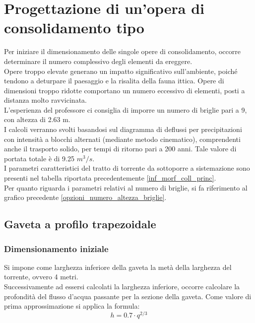 \section{Progettazione di un'opera di consolidamento tipo}
Per iniziare il dimensionamento delle singole opere di consolidamento, occorre determinare il numero complessivo degli elementi da ereggere.\\
Opere troppo elevate generano un impatto significativo sull'ambiente, poiché tendono a deturpare il paesaggio e la risalita della fauna ittica. Opere di dimensioni troppo ridotte comportano un numero eccessivo di elementi, posti a distanza molto ravvicinata.\\
L'esperienza del professore ci consiglia di imporre un numero di briglie pari a 9, con altezza di 2.63 m.\\
I calcoli verranno svolti basandosi sul diagramma di deflussi per precipitazioni con intensità a blocchi alternati (mediante metodo cinematico), comprendenti anche il trasporto solido, per tempi di ritorno pari a 200 anni. Tale valore di portata totale è di 9.25 $m^3/s$.\\
I parametri caratteristici del tratto di torrente da sottoporre a sistemazione sono presenti nel tabella riportata precedentemente \ref{inf_morf_coll_princ}.\\
Per quanto riguarda i parametri relativi al numero di briglie, si fa riferimento al grafico precedente \ref{opzioni_numero_altezza_briglie}.
\subsection{Gaveta a profilo trapezoidale}
\subsubsection{Dimensionamento iniziale}
Si impone come larghezza inferiore della gaveta la metà della larghezza del torrente, ovvero 4 metri.\\
Successivamente ad essersi calcolati la larghezza inferiore, occorre calcolare la profondità del flusso d'acqua passante per la sezione della gaveta. Come valore di prima approssimazione si applica la formula:
\begin{equation}
    h = 0.7 \cdot q ^{2/3}
\end{equation}